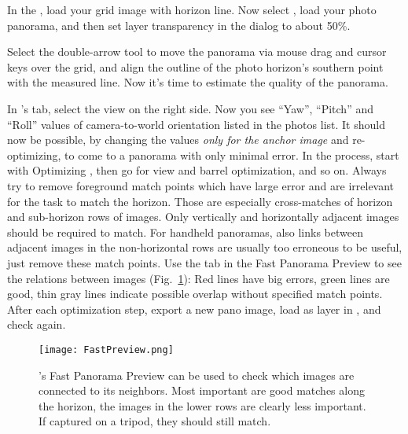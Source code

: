In the , load your grid image with horizon line.  Now
select , load your photo panorama,
and then set layer transparency in the  dialog to about
50\%.

Select the double-arrow tool to move the panorama via mouse drag and
cursor keys over the grid, and align the outline of the photo
horizon's southern point with the measured line. Now it's time to
estimate the quality of the panorama.

In 's  tab, select the  view on
the right side. Now you see ``Yaw'', ``Pitch'' and ``Roll'' values of
camera-to-world orientation listed in the photos list. It should now
be possible, by changing the values \emph{only for the anchor image}
and re-optimizing, to come to a panorama with only minimal error. In
the process, start with Optimizing , then go for view and barrel optimization, and so on. Always
try to remove foreground match points which have large error and are irrelevant
for the task to match the horizon. Those are especially cross-matches
of horizon and sub-horizon rows of images. Only vertically and
horizontally adjacent images should be required to match. For handheld
panoramas, also links between adjacent images in the non-horizontal rows are usually
too erroneous to be useful, just remove these match points. Use the
 tab in the Fast Panorama Preview to see the relations
between images (Fig.~\ref{fig:FastPanoPreview}): Red lines have big
errors, green lines are good, thin gray lines indicate possible
overlap without specified match points. After each optimization step,
export a new pano image, load as layer in , and check
again.

\begin{figure}[tb]
  \centering
    \texttt{[image: FastPreview.png]}
    \caption{'s Fast Panorama Preview can be used to check which
      images are connected to its neighbors. Most important are good
      matches along the horizon, the images in the lower rows are
      clearly less important. If captured on a tripod, they should
      still match. }
  \label{fig:FastPanoPreview}
\end{figure}


\noindent
\colorbox{light-gray}{}





